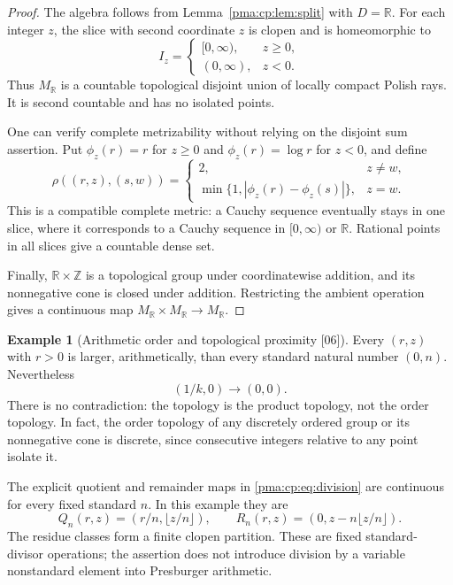 \documentclass[11pt]{article}
\numberwithin{equation}{section}
\theoremstyle{definition}
\newtheorem{example}[example]{Example}
\theoremstyle{remark}
\newcommand{\Z}{\mathbb Z}
\newcommand{\R}{\mathbb R}
\newcommand{\src}[1]{\textup{\textsf{\small[#1]}}}
\begin{document}
\begin{proof}
The algebra follows from Lemma~\ref{pma:cp:lem:split} with $D=\R$.
For each integer $z$, the slice with second coordinate $z$ is clopen and
is homeomorphic to
\[
 I_z=\begin{cases}[0,\infty),&z\geq0,\\(0,\infty),&z<0.
 \end{cases}
\]
Thus $M_{\R}$ is a countable topological disjoint union of locally compact
Polish rays. It is second countable and has no isolated points.

One can verify complete metrizability without relying on the disjoint
sum assertion. Put $\phi_z(r)=r$ for $z\geq0$ and $\phi_z(r)=\log r$ for
$z<0$, and define
\[
 \rho((r,z),(s,w))=
 \begin{cases}
 2,&z\neq w,\\
 \min\{1,|\phi_z(r)-\phi_z(s)|\},&z=w.
 \end{cases}
\]
This is a compatible complete metric: a Cauchy sequence eventually stays
in one slice, where it corresponds to a Cauchy sequence in $[0,\infty)$
or $\R$. Rational points in all slices give a countable dense set.

Finally, $\R\times\Z$ is a topological group under coordinatewise
addition, and its nonnegative cone is closed under addition. Restricting
the ambient operation gives a continuous map
$M_{\R}\times M_{\R}\to M_{\R}$.
\end{proof}

\begin{example}[Arithmetic order and topological proximity \src{06}]
Every $(r,z)$ with $r>0$ is larger, arithmetically, than every standard
natural number $(0,n)$. Nevertheless
\[
 (1/k,0)\longrightarrow(0,0).
\]
There is no contradiction: the topology is the product topology, not
the order topology. In fact, the order topology of any discretely ordered
group or its nonnegative cone is discrete, since consecutive integers
relative to any point isolate it.
\end{example}

The explicit quotient and remainder maps in \eqref{pma:cp:eq:division} are
continuous for every fixed standard $n$. In this example they are
\[
 Q_n(r,z)=(r/n,\lfloor z/n\rfloor),\qquad
 R_n(r,z)=(0,z-n\lfloor z/n\rfloor).
\]
The residue classes form a finite clopen partition. These are fixed
standard-divisor operations; the assertion does not introduce division
by a variable nonstandard element into Presburger arithmetic.
\end{document}
